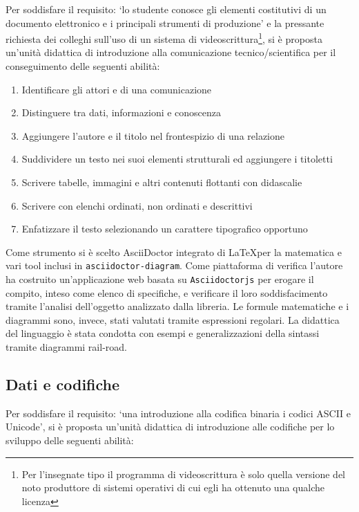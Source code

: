 \documentclass{easychair}
\begin{document}
Per soddisfare il requisito: `lo studente conosce gli elementi costitutivi
di un documento elettronico e i principali strumenti di produzione' e la
pressante richiesta dei colleghi sull'uso di un sistema di videoscrittura\footnote{Per
l'insegnate tipo il programma di videoscrittura è solo quella versione del noto produttore
di sistemi operativi di cui egli ha ottenuto una qualche licenza}, si è proposta un'unità
didattica di introduzione alla comunicazione tecnico/scientifica per il conseguimento
delle seguenti abilità:

\begin{enumerate}
\item
  Identificare gli attori e di una comunicazione
\item
  Distinguere tra dati, informazioni e conoscenza
\item
  Aggiungere l'autore e il titolo nel frontespizio di una relazione
\item
  Suddividere un testo nei suoi elementi strutturali ed aggiungere i
  titoletti
\item
  Scrivere tabelle, immagini e altri contenuti flottanti con didascalie
\item
  Scrivere con elenchi ordinati, non ordinati e descrittivi
\item
  Enfatizzare il testo selezionando un carattere tipografico opportuno
\end{enumerate}

Come strumento si è scelto AsciiDoctor integrato di \LaTeX per la matematica
e vari tool inclusi in \texttt{asciidoctor-diagram}. Come piattaforma di verifica
l'autore ha costruito un'applicazione web basata su  \texttt{Asciidoctorjs} per
erogare il compito, inteso come elenco di specifiche, e verificare il
loro soddisfacimento tramite l'analisi dell'oggetto analizzato dalla
libreria. Le formule matematiche e i diagrammi sono, invece, stati
valutati tramite espressioni regolari.
La didattica del linguaggio è stata condotta con esempi e generalizzazioni
della sintassi tramite diagrammi rail-road.

\subsection[Dati e codifiche]{Dati e codifiche} 

Per soddisfare il requisito: `\textellipsis una introduzione alla codifica binaria
\textellipsis i codici ASCII e Unicode', si è proposta un'unità
didattica di introduzione alle codifiche per lo sviluppo delle seguenti
abilità:
\end{document}
